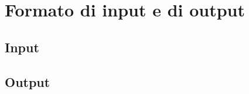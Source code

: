 \def\baselinestretch{1}
\section{Formato di input e di output}
\def\baselinestretch{1.66}
\thispagestyle{headings}

\subsection{Input}

\subsection{Output}